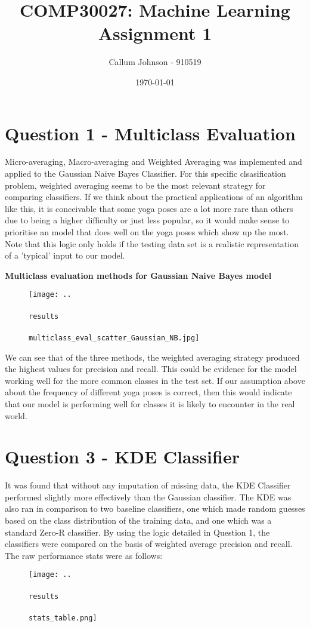 \documentclass[11pt]{article}
\title{COMP30027: Machine Learning Assignment 1}
\author{ Callum Johnson - 910519 }
\date{\today}
\begin{document}
\maketitle	
\pagebreak



\section{Question 1 - Multiclass Evaluation}
Micro-averaging, Macro-averaging and Weighted Averaging was implemented and applied to the Gaussian Naive Bayes Classifier.
For this specific clsasification problem, weighted averaging seems to be the most relevant strategy for comparing classifiers. If we think about the practical applications of an algorithm like this, it is conceivable
that some yoga poses are a lot more rare than others due to being a higher difficulty or just less popular, so it would make sense to prioritise an model that does well on the yoga poses which show up the most.
Note that this logic only holds if the testing data set is a realistic representation of a 'typical' input to our model.

\begin{center}
    \textbf{Multiclass evaluation methods for Gaussian Naive Bayes model}
\end{center}

\begin{figure}[h]
    \centerline{\texttt{[image: ..\\\\results\\\\multiclass\_eval\_scatter\_Gaussian\_NB.jpg]}}
\end{figure}

\noindent We can see that of the three methods, the weighted averaging strategy produced the highest values for precision and recall. This could be evidence for the model working well for the more common
classes in the test set. If our assumption above about the frequency of different yoga poses is correct, then this would indicate that our model is performing well for classes it is likely to encounter in the real world.
\pagebreak
\section{Question 3 - KDE Classifier}
It was found that without any imputation of missing data, the KDE Classifier
performed slightly more effectively than the Gaussian classifier. The KDE was also ran in comparison to two baseline classifiers, 
one which made random guesses based on the class distribution of the training data, and one which was a standard Zero-R classifier. 
By using the logic detailed in Question 1, the classifiers were compared on the basis of weighted average precision and recall. The raw performance stats were as follows:
\begin{figure}[h]
    \centerline{\texttt{[image: ..\\\\results\\\\stats\_table.png]}}
\end{figure}
\end{document}
